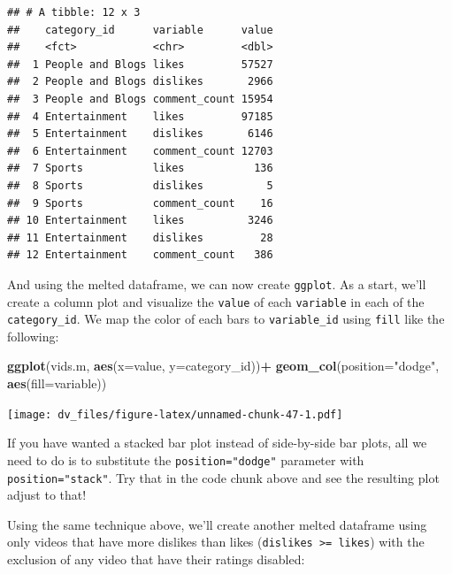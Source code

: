 \documentclass[]{article}
\newenvironment{Shaded}{\begin{snugshade}}{\end{snugshade}}
\newcommand{\DataTypeTok}[1]{\textcolor[rgb]{0.13,0.29,0.53}{#1}}
\newcommand{\KeywordTok}[1]{\textcolor[rgb]{0.13,0.29,0.53}{\textbf{#1}}}
\newcommand{\NormalTok}[1]{#1}
\newcommand{\OperatorTok}[1]{\textcolor[rgb]{0.81,0.36,0.00}{\textbf{#1}}}
\newcommand{\StringTok}[1]{\textcolor[rgb]{0.31,0.60,0.02}{#1}}
\begin{document}
\begin{verbatim}
## # A tibble: 12 x 3
##    category_id      variable      value
##    <fct>            <chr>         <dbl>
##  1 People and Blogs likes         57527
##  2 People and Blogs dislikes       2966
##  3 People and Blogs comment_count 15954
##  4 Entertainment    likes         97185
##  5 Entertainment    dislikes       6146
##  6 Entertainment    comment_count 12703
##  7 Sports           likes           136
##  8 Sports           dislikes          5
##  9 Sports           comment_count    16
## 10 Entertainment    likes          3246
## 11 Entertainment    dislikes         28
## 12 Entertainment    comment_count   386
\end{verbatim}

And using the melted dataframe, we can now create \texttt{ggplot}. As a
start, we'll create a column plot and visualize the \texttt{value} of
each \texttt{variable} in each of the \texttt{category\_id}. We map the
color of each bars to \texttt{variable\_id} using \texttt{fill} like the
following:

\begin{Shaded}
\begin{Highlighting}[]
\KeywordTok{ggplot}\NormalTok{(vids.m, }\KeywordTok{aes}\NormalTok{(}\DataTypeTok{x=}\NormalTok{value, }\DataTypeTok{y=}\NormalTok{category_id))}\OperatorTok{+}
\StringTok{  }\KeywordTok{geom_col}\NormalTok{(}\DataTypeTok{position=}\StringTok{"dodge"}\NormalTok{, }\KeywordTok{aes}\NormalTok{(}\DataTypeTok{fill=}\NormalTok{variable))}
\end{Highlighting}
\end{Shaded}

\texttt{[image: dv\_files/figure-latex/unnamed-chunk-47-1.pdf]}

If you have wanted a stacked bar plot instead of side-by-side bar plots,
all we need to do is to substitute the \texttt{position="dodge"}
parameter with \texttt{position="stack"}. Try that in the code chunk
above and see the resulting plot adjust to that!

Using the same technique above, we'll create another melted dataframe
using only videos that have more dislikes than likes
(\texttt{dislikes\ \textgreater{}=\ likes}) with the exclusion of any
video that have their ratings disabled:
\end{document}
